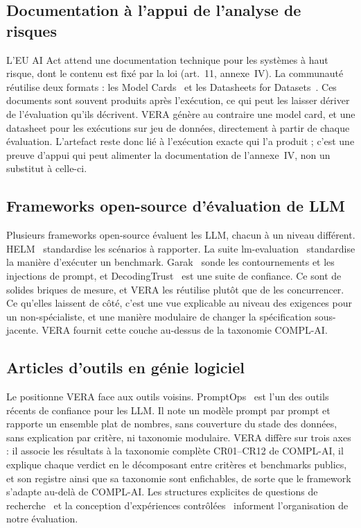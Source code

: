 \documentclass[10pt,conference]{IEEEtran}
\begin{document}
\subsection{Documentation à l'appui de l'analyse de risques}
L'EU AI Act attend une documentation technique pour les systèmes à haut risque, dont le contenu est fixé par la loi (art.~11, annexe~IV).
La communauté réutilise deux formats : les Model Cards~\cite{mitchell2019modelcard} et les Datasheets for Datasets~\cite{gebru2021datasheets}.
Ces documents sont souvent produits après l'exécution, ce qui peut les laisser dériver de l'évaluation qu'ils décrivent.
VERA génère au contraire une model card, et une datasheet pour les exécutions sur jeu de données, directement à partir de chaque évaluation.
L'artefact reste donc lié à l'exécution exacte qui l'a produit ; c'est une preuve d'appui qui peut alimenter la documentation de l'annexe~IV, non un substitut à celle-ci.

\subsection{Frameworks open-source d'évaluation de LLM}
Plusieurs frameworks open-source évaluent les LLM, chacun à un niveau différent.
HELM~\cite{liang2023helm} standardise les scénarios à rapporter.
La suite lm-evaluation~\cite{gao2021lmevalharness} standardise la manière d'exécuter un benchmark.
Garak~\cite{derczynski2024garak} sonde les contournements et les injections de prompt, et DecodingTrust~\cite{wang2023decodingtrust} est une suite de confiance.
Ce sont de solides briques de mesure, et VERA les réutilise plutôt que de les concurrencer.
Ce qu'elles laissent de côté, c'est une vue explicable au niveau des exigences pour un non-spécialiste, et une manière modulaire de changer la spécification sous-jacente.
VERA fournit cette couche au-dessus de la taxonomie COMPL-AI.

\subsection{Articles d'outils en génie logiciel}
Le  positionne VERA face aux outils voisins.
PromptOps~\cite{sunetnanta2025promptops} est l'un des outils récents de confiance pour les LLM.
Il note un modèle prompt par prompt et rapporte un ensemble plat de nombres, sans couverture du stade des données, sans explication par critère, ni taxonomie modulaire.
VERA diffère sur trois axes : il associe les résultats à la taxonomie complète CR01--CR12 de COMPL-AI, il explique chaque verdict en le décomposant entre critères et benchmarks publics, et son registre ainsi que sa taxonomie sont enfichables, de sorte que le framework s'adapte au-delà de COMPL-AI.
Les structures explicites de questions de recherche~\cite{liu2022mscpdp} et la conception d'expériences contrôlées~\cite{weninger2018usecase} informent l'organisation de notre évaluation.
\end{document}
